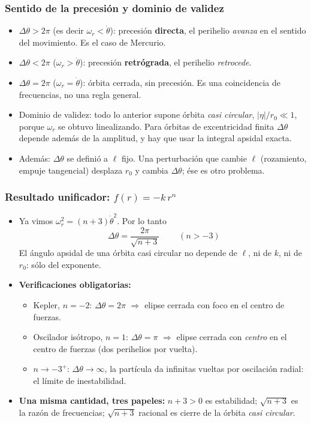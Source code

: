 \documentclass[10pt]{beamer}
\newcommand{\dth}{\Delta\theta}          %
\begin{document}
\begin{frame}
\frametitle{Sentido de la precesión y dominio de validez}
\begin{itemize}
  \item<1-> $\dth>2\pi$ (es decir $\omega_r<\dot\theta$): precesión
        \textbf{directa}, el perihelio \emph{avanza} en el sentido del
        movimiento. Es el caso de Mercurio.
  \item<2-> $\dth<2\pi$ ($\omega_r>\dot\theta$): precesión
        \textbf{retrógrada}, el perihelio \emph{retrocede}.
  \item<3-> $\dth=2\pi$ ($\omega_r=\dot\theta$): órbita cerrada, sin precesión.
        Es una coincidencia de frecuencias, no una regla general.
  \item<4-> \alert{Dominio de validez:} todo lo anterior supone órbita
        \emph{casi circular}, $|\eta|/r_0\ll1$, porque $\omega_r$ se obtuvo
        linealizando. Para órbitas de excentricidad finita $\dth$ depende
        además de la amplitud, y hay que usar la integral apsidal exacta.
  \item<5-> \alert{Además:} $\dth$ se definió a $\ell$ fijo. Una perturbación
        que cambie $\ell$ (rozamiento, empuje tangencial) desplaza $r_0$ y
        cambia $\dth$; ése es otro problema.
\end{itemize}
\end{frame}

\begin{frame}
\frametitle{Resultado unificador: $f(r)=-k\,r^{n}$}
\begin{itemize}
  \item<1-> Ya vimos $\omega_r^{2}=(n+3)\dot\theta^{2}$. Por lo tanto
        \[ \boxed{\;\dth=\frac{2\pi}{\sqrt{n+3}}\;}\qquad (n>-3) \]
        El ángulo apsidal de una órbita casi circular \alert{no depende de
        $\ell$, ni de $k$, ni de $r_0$}: sólo del exponente.
  \item<2-> \textbf{Verificaciones obligatorias:}
        \begin{itemize}
          \item Kepler, $n=-2$: $\dth=2\pi$ $\Rightarrow$ elipse cerrada con
                foco en el centro de fuerzas. \checkmark
          \item Oscilador isótropo, $n=1$: $\dth=\pi$ $\Rightarrow$ elipse
                cerrada con \emph{centro} en el centro de fuerzas (dos
                perihelios por vuelta). \checkmark
          \item $n\to-3^{+}$: $\dth\to\infty$, la partícula da infinitas
                vueltas por oscilación radial: el límite de inestabilidad.
        \end{itemize}
  \item<3-> \textbf{Una misma cantidad, tres papeles:} $n+3>0$ es estabilidad;
        $\sqrt{n+3}$ es la razón de frecuencias; $\sqrt{n+3}$ racional es
        cierre de la órbita \emph{casi circular}.
\end{itemize}
\end{frame}
\end{document}
